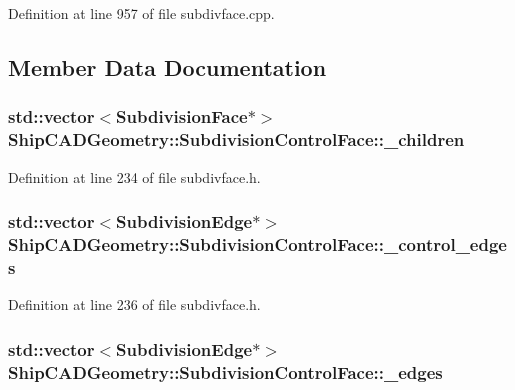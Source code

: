 Definition at line 957 of file subdivface.\-cpp.



\subsection{Member Data Documentation}
\hypertarget{classShipCADGeometry_1_1SubdivisionControlFace_a241bcefc9f6727dec87f6a754f99cc3d}{
\subsubsection[{\-\_\-children}]{\setlength{\rightskip}{0pt plus 5cm}std\-::vector$<${\bf Subdivision\-Face}$\ast$$>$ Ship\-C\-A\-D\-Geometry\-::\-Subdivision\-Control\-Face\-::\-\_\-children\hspace{0.3cm}{\ttfamily [protected]}}}\label{classShipCADGeometry_1_1SubdivisionControlFace_a241bcefc9f6727dec87f6a754f99cc3d}


Definition at line 234 of file subdivface.\-h.

\hypertarget{classShipCADGeometry_1_1SubdivisionControlFace_a48e3cc6374d71f4be7106a48fc321eec}{
\subsubsection[{\-\_\-control\-\_\-edges}]{\setlength{\rightskip}{0pt plus 5cm}std\-::vector$<${\bf Subdivision\-Edge}$\ast$$>$ Ship\-C\-A\-D\-Geometry\-::\-Subdivision\-Control\-Face\-::\-\_\-control\-\_\-edges\hspace{0.3cm}{\ttfamily [protected]}}}\label{classShipCADGeometry_1_1SubdivisionControlFace_a48e3cc6374d71f4be7106a48fc321eec}


Definition at line 236 of file subdivface.\-h.

\hypertarget{classShipCADGeometry_1_1SubdivisionControlFace_a5efceb94118053e2d6ffdff45f68489e}{
\subsubsection[{\-\_\-edges}]{\setlength{\rightskip}{0pt plus 5cm}std\-::vector$<${\bf Subdivision\-Edge}$\ast$$>$ Ship\-C\-A\-D\-Geometry\-::\-Subdivision\-Control\-Face\-::\-\_\-edges\hspace{0.3cm}{\ttfamily [protected]}}}\label{classShipCADGeometry_1_1SubdivisionControlFace_a5efceb94118053e2d6ffdff45f68489e}


